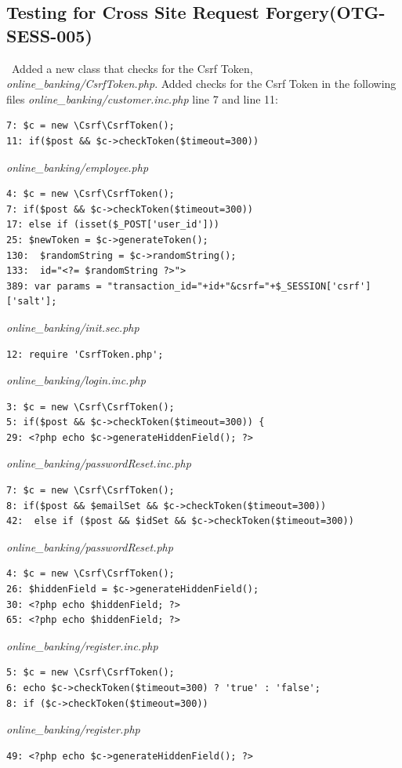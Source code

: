 \documentclass[headsepline,footsepline,footinclude=false,oneside,fontsize=11pt,paper=a4,listof=totoc,bibliography=totoc]{scrbook} %
\begin{document}
\subsection{Testing for Cross Site Request Forgery(OTG-SESS-005)}\
Added a new class that checks for the Csrf Token, \textit{online\_banking/CsrfToken.php}.
Added checks for the Csrf Token in the following files \textit{online\_banking/customer.inc.php} line 7 and line 11:
\begin{lstlisting}
7: $c = new \Csrf\CsrfToken(); 
11: if($post && $c->checkToken($timeout=300))
\end{lstlisting} 
\textit{online\_banking/employee.php}
\begin{lstlisting}
4: $c = new \Csrf\CsrfToken();
7: if($post && $c->checkToken($timeout=300))
17: else if (isset($_POST['user_id'])) 
25: $newToken = $c->generateToken();
130:  $randomString = $c->randomString();
133:  id="<?= $randomString ?>">
389: var params = "transaction_id="+id+"&csrf="+$_SESSION['csrf']['salt'];
\end{lstlisting} 
\textit{online\_banking/init.sec.php}
\begin{lstlisting}
12: require 'CsrfToken.php';
\end{lstlisting} 
\textit{online\_banking/login.inc.php}
\begin{lstlisting}
3: $c = new \Csrf\CsrfToken();
5: if($post && $c->checkToken($timeout=300)) {
29: <?php echo $c->generateHiddenField(); ?>
\end{lstlisting} 
\textit{online\_banking/passwordReset.inc.php}
\begin{lstlisting}
7: $c = new \Csrf\CsrfToken();
8: if($post && $emailSet && $c->checkToken($timeout=300)) 
42:  else if ($post && $idSet && $c->checkToken($timeout=300))
\end{lstlisting}
\textit{online\_banking/passwordReset.php}
\begin{lstlisting}
4: $c = new \Csrf\CsrfToken();
26: $hiddenField = $c->generateHiddenField();
30: <?php echo $hiddenField; ?>
65: <?php echo $hiddenField; ?>
\end{lstlisting}
\textit{online\_banking/register.inc.php}
\begin{lstlisting}
5: $c = new \Csrf\CsrfToken();
6: echo $c->checkToken($timeout=300) ? 'true' : 'false';
8: if ($c->checkToken($timeout=300))

\end{lstlisting}
\textit{online\_banking/register.php}
\begin{lstlisting} 
49: <?php echo $c->generateHiddenField(); ?>
\end{lstlisting}
\end{document}
